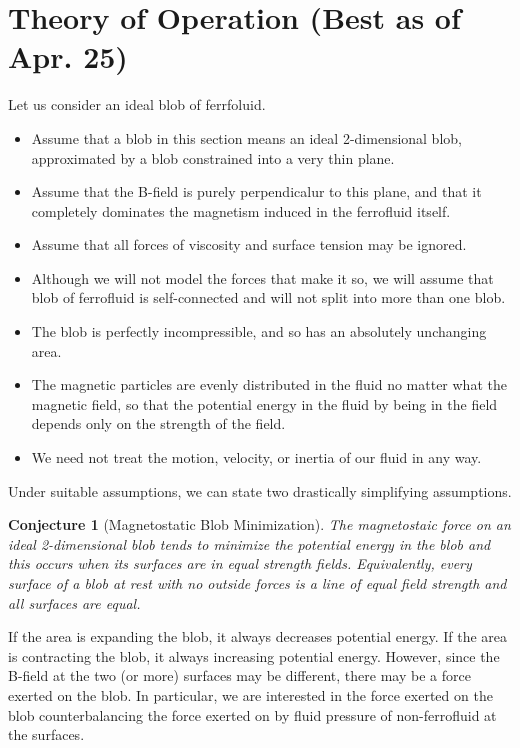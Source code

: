 \documentclass{asme2ej}
\newtheorem{conjecture}{Conjecture}
\begin{document}
\section{Theory of Operation (Best as of Apr. 25)}

Let us consider an ideal blob of ferrfoluid.
\begin{itemize}
\item Assume that a blob in this section means an ideal 2-dimensional blob,
approximated by a blob constrained into a very thin plane.
\item Assume that the B-field is purely perpendicalur to this plane,
and that it completely dominates the magnetism induced in
the ferrofluid itself.
\item Assume that all forces of viscosity and surface tension may
  be ignored.
\item Although we will not model the forces that make it so,
  we will assume that blob of ferrofluid is self-connected and
  will not split into more than one blob.
\item The blob is perfectly incompressible, and so
  has an absolutely unchanging area.
\item The magnetic particles are evenly distributed in the
  fluid no matter what the magnetic field, so that the potential
  energy in the fluid by being in the field depends only on the
  strength of the field.
\item We need not treat the motion, velocity, or inertia of
  our fluid in any way.
\end{itemize}
Under suitable assumptions, we can state two drastically
simplifying assumptions.

\begin{conjecture}[Magnetostatic Blob Minimization]
  \label{conj:mbf}
  The magnetostaic force on an ideal 2-dimensional blob
  tends to minimize the potential energy in the blob
  and this occurs when its surfaces are in equal strength fields.
  Equivalently, every surface of a blob at rest with no outside
  forces is a line of equal field strength and all surfaces are equal.
\end{conjecture}


If the area is expanding the blob, it always decreases potential
energy. If the area is contracting the blob, it always increasing
potential energy. However, since the B-field at the two (or more)
surfaces may be different, there may be a force exerted on the
blob. In particular, we are interested in the force exerted on
the blob counterbalancing the force exerted on by fluid pressure
of non-ferrofluid at the surfaces.
\end{document}
